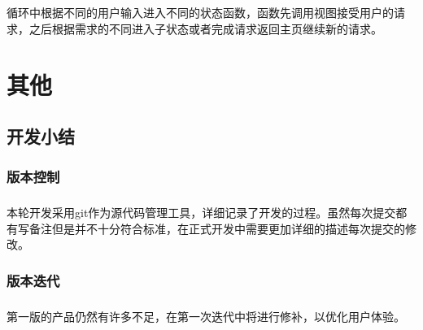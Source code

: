 \documentclass[notitlepage,cs4size,punct,oneside]{report}
\begin{document}
\begin{CJK}{UTF8}{hei}
\paragraph{}循环中根据不同的用户输入进入不同的状态函数，函数先调用视图接受用户的请求，之后根据需求的不同进入子状态或者完成请求返回主页继续新的请求。




\chapter{其他}
\section{开发小结}
\subsection{版本控制}
\paragraph{}本轮开发采用git作为源代码管理工具，详细记录了开发的过程。虽然每次提交都有写备注但是并不十分符合标准，在正式开发中需要更加详细的描述每次提交的修改。
\subsection{版本迭代}
\paragraph{}第一版的产品仍然有许多不足，在第一次迭代中将进行修补，以优化用户体验。
\pagebreak
\end{CJK}
\end{document}
